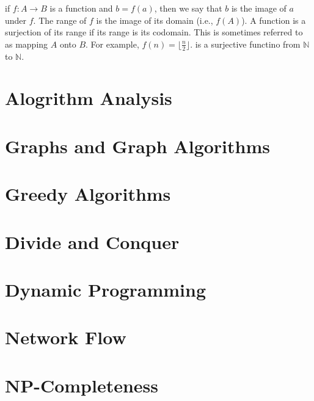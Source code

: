 \documentclass[12pt]{book}
\begin{document}
if $f:A \rightarrow B$ is a function and $b = f(a)$, then we say that
$b$ is the image of $a$ under $f$. The range of $f$ is the image of
its domain (i.e., $f(A)$). A function is a surjection of its range if
its range is its codomain. This is sometimes referred to as mapping
$A$ onto $B$. For example, $f(n) = \lfloor \frac{n}{2} \rfloor$. is a
surjective functino from $\mathbb{N}$ to $\mathbb{N}$.

\chapter{Alogrithm Analysis}

\chapter{Graphs and Graph Algorithms}

\chapter{Greedy Algorithms}

\chapter{Divide and Conquer}

\chapter{Dynamic Programming}

\chapter{Network Flow}

\chapter{NP-Completeness}

\chapter{}
\printglossaries
\end{document}
